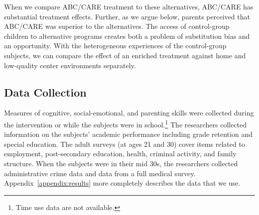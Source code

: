 When we compare ABC/CARE treatment to these alternatives, ABC/CARE has substantial treatment effects. Further, as we argue below, parents perceived that ABC/CARE was superior to the alternatives. The access of control-group children to alternative programs creates both a problem of substitution bias \citep{Heckman_1992_randomization,Heckman_Hohmann_etal_2000_QJE, Kline_Walters_2016_QJE} and an opportunity. With the heterogeneous experiences of the control-group subjects, we can compare the effect of an enriched treatment against home and low-quality center environments separately.

\subsection{Data Collection}

Measures of cognitive, social-emotional, and parenting skills were collected during the intervention or while the subjects were in school.\footnote{Time use data are not available.}
 The researchers collected information on the subjects' academic performance including grade retention and special education. The adult surveys (at ages 21 and 30) cover items related to employment, post-secondary education, health, criminal activity, and family structure. When the subjects were in their mid 30s, the researchers collected administrative crime data and data from a full medical survey. Appendix~\ref{appendix:results} more completely describes the data that we use.


